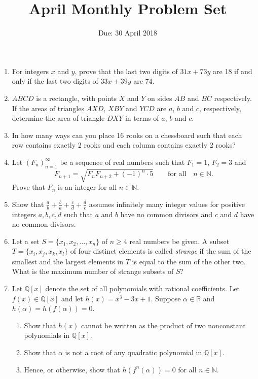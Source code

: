 \documentclass[12pt]{article}
\title{April Monthly Problem Set}
\author{Due: 30 April 2018}
\date{}
\begin{document}
 \vspace{-12pt} \maketitle \pagestyle{empty}

\begin{enumerate}

\item %
For integers $x$ and $y$, prove that the last two digits of $31x+73y$ are 18 if and only if the last two digits of $33x+39y$ are 74.


\item %
$ABCD$ is a rectangle, with points $X$ and $Y$ on sides $AB$ and $BC$ respectively. If the areas of triangles $AXD$, $XBY$ and $YCD$ are $a$, $b$ and $c$, respectively, determine the area of triangle $DXY$ in terms of $a$, $b$ and $c$.


\item %
In how many ways can you place 16 rooks on a chessboard such that each row contains exactly 2 rooks and each column contains exactly 2 rooks?


\item %
Let $(F_n)_{n=1}^\infty$ be a sequence of real numbers such that $F_1 = 1$, $F_2 = 3$ and \[F_{n+1} = \sqrt{F_{n}F_{n+2} +(-1)^n \cdot 5} \qquad \textrm{for all}\quad n\in\mathbb{N}.\] Prove that $F_n$ is an integer for all $n\in\mathbb{N}$.


\item %
Show that $\displaystyle \frac{a}{b} +\frac{b}{a} +\frac{c}{d} +\frac{d}{c}$ assumes infinitely many integer values for positive integers $a,b,c,d$ such that $a$ and $b$ have no common divisors and $c$ and $d$ have no common divisors.


\item %
Let a set $S = \{x_1,x_2,\dotsc,x_n\}$ of $n \geq 4$ real numbers be given. A subset $T = \{x_i,x_j,x_k,x_l\}$ of four distinct elements is called \emph{strange} if the sum of the smallest and the largest elements in $T$ is equal to the sum of the other two. What is the maximum number of strange subsets of $S$?


\item %
Let $\mathbb{Q}[x]$ denote the set of all polynomials with rational coefficients. Let $f(x) \in \mathbb{Q}[x]$ and let $h(x) = x^3-3x+1$. Suppose $\alpha \in \mathbb{R}$ and $h(\alpha) =h(f(\alpha)) =0$.
\begin{enumerate}[label=(\alph*)]
\item Show that $h(x)$ cannot be written as the product of two nonconstant polynomials in $\mathbb{Q}[x]$.
\item Show that $\alpha$ is not a root of any quadratic polynomial in $\mathbb{Q}[x]$.
\item Hence, or otherwise, show that $h(f^n(\alpha)) = 0$ for all $n \in \mathbb{N}$.
\end{enumerate}



\end{enumerate}
\end{document}
